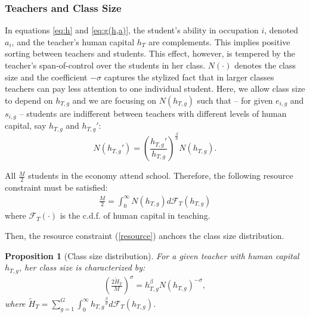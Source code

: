\documentclass[onehalfspacing,11pt]{article}
\newtheorem{prp}{Proposition}
\begin{document}
	
	\subsubsection{Teachers and Class Size}
	In equations \eqref{eq:h} and \eqref{eq:g(h,a)}, the student's ability in occupation $i$, denoted $a_i$, and the teacher's human capital $h_T$ are complements. This implies positive sorting between teachers and students. This effect, however, is tempered by the teacher's span-of-control over the students in her class. $N(\cdot)$ denotes the class size and the coefficient $-\sigma$ captures the stylized fact that in larger classes teachers can pay less attention to one individual student. Here, we allow class size to depend on $h_{T,g}$ and we are focusing on $N(h_{T,g})$ such that -- for given $e_{i,g}$ and $s_{i,g}$ -- students are indifferent between teachers with different levels of human capital, say $h_{T,g}$ and ${h_{T,g}}'$:
	\begin{equation}
		\label{ }
		N({h_{T,g}}') = \left(\frac{{h_{T,g}}'}{{h_{T,g}}}\right)^{\frac{\beta}{\sigma}} N({h_{T,g}}).
	\end{equation}
	
	All $\frac{M}{2}$ students in the economy attend school. Therefore, the following resource constraint must be satisfied:
	\begin{align}
		\label{resource}
		\frac{M}{2}=\int_0^\infty N(h_{T,g})d\mathcal{F}_T(h_{T,g}) 
	\end{align}
	where $\mathcal{F}_T(\cdot)$ is the c.d.f. of human capital in teaching.
	
	Then, the resource constraint (\ref{resource}) anchors the class size distribution.
	\begin{prp}[Class size distribution] For a given teacher with human capital $h_{T,g}$, her class size is characterized by:
		\begin{align}
			\left(\frac{2\widetilde{H}_T}{M}\right)^\sigma=h_{T,g}^\beta N(h_{T,g})^{-\sigma},
		\end{align}
		where $\widetilde{H}_T = \sum_{g=1}^G \int_0^\infty {h_{T,g}}^{\frac{\beta}{\sigma}} d\mathcal{F}_T(h_{T,g}) $.
	\end{prp}
	
\end{document}
